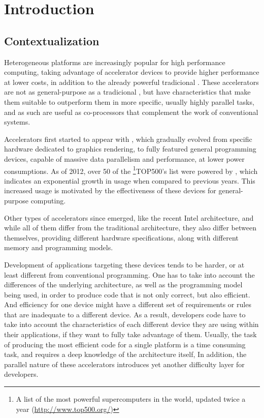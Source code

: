 \documentclass[main.tex]{subfiles}
\begin{document}
\section{Introduction}

\subsection{Contextualization}

Heterogeneous platforms are increasingly popular for high performance computing, taking advantage of accelerator devices to provide higher performance at lower costs, in addition to the already powerful tradicional \cpus. These accelerators are not as general-purpose as a tradicional \cpu, but have characteristics that make them suitable to outperform them in more specific, usually highly parallel tasks, and as such are useful as co-processors that complement the work of conventional systems.

Accelerators first started to appear with \gpus, which gradually evolved from specific hardware dedicated to graphics rendering, to fully featured general programming devices, capable of massive data parallelism and performance, at lower power consumptions. As of 2012, over 50 of the \footnote{A list of the most powerful supercomputers in the world, updated twice a year (\url{http://www.top500.org/})}{TOP500's} list were powered by \gpus, which indicates an exponential growth in usage when compared to previous years. This increased usage is motivated by the effectiveness of these devices for general-purpose computing.

Other types of accelerators since emerged, like the recent Intel \mic architecture, and while all of them differ from the traditional \cpu architecture, they also differ between themselves, providing different hardware specifications, along with different memory and programming models. 

Development of applications targeting these devices tends to be harder, or at least different from conventional programming. One has to take into account the differences of the underlying architecture, as well as the programming model being used, in order to produce code that is not only correct, but also efficient. And efficiency for one device might have a different set of requirements or rules that are inadequate to a different device. As a result, developers code have to take into account the characteristics of each different device they are using within their applications, if they want to fully take advantage of them. Usually, the task of producing the most efficient code for a single platform is a time consuming task, and requires a deep knowledge of the architecture itself, In addition, the parallel nature of these accelerators introduces yet another difficulty layer for developers.
\end{document}
